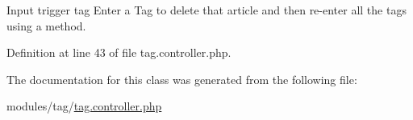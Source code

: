 Input trigger tag Enter a Tag to delete that article and then re-\/enter all the tags using a method. 



Definition at line 43 of file tag.\+controller.\+php.



The documentation for this class was generated from the following file\+:\begin{DoxyCompactItemize}
\item 
modules/tag/\hyperlink{tag_8controller_8php}{tag.\+controller.\+php}\end{DoxyCompactItemize}
